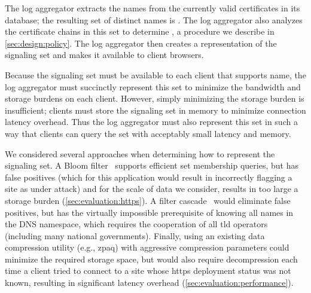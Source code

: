 The log aggregator extracts the names from the currently valid
certificates in its database;
the resulting set of distinct names is \httpsset. 
The log aggregator also analyzes the certificate chains
in this set to determine \multicertset, a procedure we describe in
\autoref{sec:design:policy}. The log aggregator then creates a representation of
the signaling set and makes it available to client browsers.

Because the signaling set must be available to each client that supports \ac{name},
the log aggregator must succinctly represent this set to minimize the bandwidth and storage burdens on
each client. However, simply minimizing the storage burden is insufficient;
clients must store the signaling set in memory to minimize connection latency
overhead. Thus the log aggregator must also represent this set in such a way
that clients can query the set with acceptably small latency and memory.

We considered several approaches when determining how to represent the signaling
set. A Bloom filter~\cite{bloom1970space} supports efficient set membership
queries, but has false positives (which for this application would result in
incorrectly flagging a site as under attack) and for the scale of data we
consider, results in too large a storage burden
(\autoref{sec:evaluation:https}). A filter cascade~\cite{salikhov2014using}
would eliminate false positives, but has the virtually impossible prerequisite
of knowing all names in the DNS namespace, which requires the cooperation of all
\ac{tld} operators (including many national governments). Finally, using an
existing data compression utility (e.g., zpaq) with aggressive compression
parameters could minimize the required storage space, but would also require
decompression each time a client tried to connect to a site whose \ac{https}
deployment status was not known, resulting in significant latency overhead
(\autoref{sec:evaluation:performance}).


